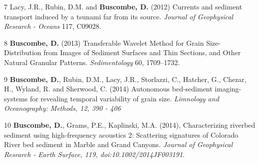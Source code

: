 \documentclass[margin,line]{resume}
\begin{document}
\begin{resume}
\begin{footnotesize}
\begin{list1}
	\item[7] Lacy, J.R., Rubin, D.M. and {\bf Buscombe, D.} (2012) Currents and sediment transport induced by a tsunami far from its source. {\sl Journal of Geophysical Research - Oceans} 117, C09028.\\

    \item[8] {\bf Buscombe, D.} (2013) Transferable Wavelet Method for Grain Size-Distribution from Images of Sediment Surfaces and Thin Sections, and Other Natural Granular Patterns. {\sl Sedimentology} 60, 1709--1732.\\

	\item[9] {\bf Buscombe, D.}, Rubin, D.M., Lacy, J.R., Storlazzi, C., Hatcher, G., Chezar, H., Wyland, R. and Sherwood, C. (2014) Autonomous bed-sediment imaging-systems for revealing temporal variability of grain size. {\sl Limnology and Oceanography: Methods, 12, 390 - 406}\\

	\item[10] {\bf Buscombe, D.}, Grams, P.E., Kaplinski, M.A. (2014), Characterizing riverbed sediment using high-frequency acoustics 2: Scattering signatures of Colorado River bed sediment in Marble and Grand Canyons. {\sl Journal of Geophysical Research - Earth Surface, 119, doi:10.1002/2014JF003191}.

	\end{list1}
        \end{footnotesize}
        

\end{resume}
\end{document}
